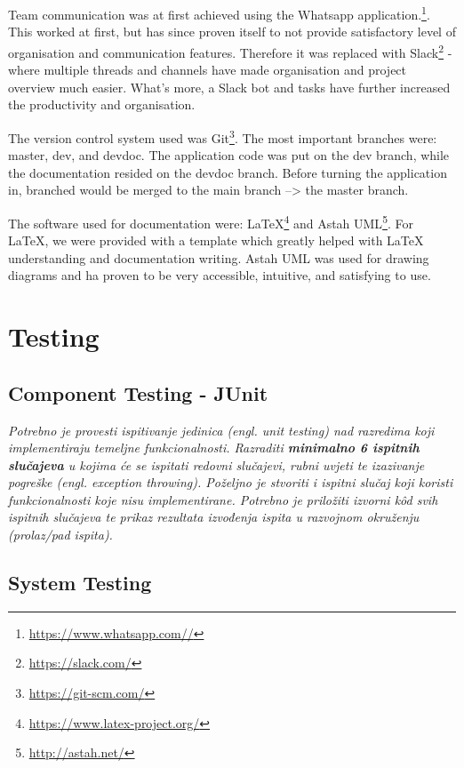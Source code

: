 		Team communication was at first achieved using the Whatsapp application.\footnote{\url{https://www.whatsapp.com//}}. This worked at first, but has since proven itself to not provide satisfactory level of organisation and communication features. Therefore it was replaced with Slack\footnote{\url{https://slack.com/}} - where multiple threads and channels have made organisation and project overview much easier. What's more, a Slack bot and tasks have further increased the productivity and organisation.
		
		The version control system used was Git\footnote{\url{https://git-scm.com/}}. The most important branches were: master, dev, and devdoc. The application code was put on the dev branch, while the documentation resided on the devdoc branch. Before turning the application in, branched would be merged to the main branch --> the master branch. 
		
		The software used for documentation were: LaTeX\footnote{\url{https://www.latex-project.org/}} and Astah UML\footnote{\url{http://astah.net/}}. For LaTeX, we were provided with a template which greatly helped with LaTeX understanding and documentation writing. Astah UML was used for drawing diagrams and ha proven to be very accessible, intuitive, and satisfying to use.
		
		\eject 
	
		\section{Testing}
	
			
			\subsection{Component Testing - JUnit}
			\textit{Potrebno je provesti ispitivanje jedinica (engl. unit testing) nad razredima koji implementiraju temeljne funkcionalnosti. Razraditi \textbf{minimalno 6 ispitnih slučajeva} u kojima će se ispitati redovni slučajevi, rubni uvjeti te izazivanje pogreške (engl. exception throwing). Poželjno je stvoriti i ispitni slučaj koji koristi funkcionalnosti koje nisu implementirane. Potrebno je priložiti izvorni kôd svih ispitnih slučajeva te prikaz rezultata izvođenja ispita u razvojnom okruženju (prolaz/pad ispita). }
			
			
			
			\subsection{System Testing}
			
